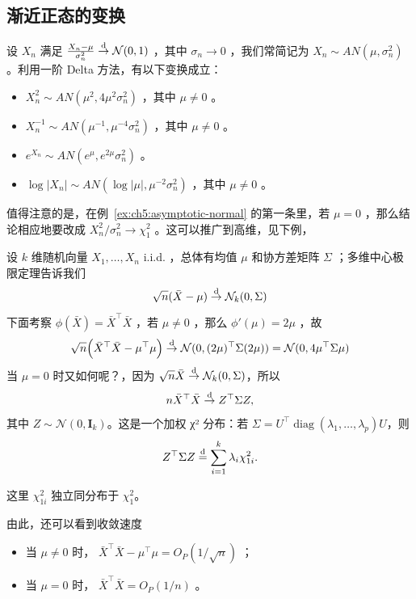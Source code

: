 \subsection{渐近正态的变换}

\begin{example} \label{ex:ch5:asymptotic-normal}
设 $X_n$ 满足 $\frac{X_n-\mu}{\sigma_n^2}\overset{\rm d}\to \mathcal N(0,1)$ ，其中 $\sigma_n\to 0$ ，我们常简记为 $X_n \sim AN(\mu,\sigma_n^2)$。利用一阶 Delta 方法，有以下变换成立：

\begin{itemize}
\tightlist
\item
  $X^2_n \sim AN(\mu^2,4\mu^2\sigma_n^2)$ ，其中 $\mu\ne 0$ 。
\item
  $X_n^{-1}\sim AN(\mu^{-1},\mu^{-4}\sigma_n^2)$ ，其中 $\mu\ne 0$ 。
\item
  $e^{X_n}\sim AN(e^\mu,e^{2\mu}\sigma_n^2)$ 。
\item
  $\log |X_n|\sim AN(\log |\mu|,\mu^{-2}\sigma_n^2 )$ ，其中 $\mu\ne 0$ 。
\end{itemize}
\end{example}


值得注意的是，在例~\ref{ex:ch5:asymptotic-normal} 的第一条里，若 $\mu=0$ ，那么结论相应地要改成 $X_n^2/\sigma_n^2 \to \chi_1^2$ 。这可以推广到高维，见下例，


\begin{example}
设 $k$ 维随机向量 $X_1,\dots,X_n$ i.i.d. ，总体有均值 $\mu$ 和协方差矩阵 $\Sigma$ ；多维中心极限定理告诉我们 \[ \sqrt{n}(\bar{X}-\mu)\overset{\rm d}\to \mathcal N_k(0,\Sigma) \]下面考察 $\phi(\bar{X})=\bar{X}^\top \bar X$ ，若 $\mu\ne 0$ ，那么 $\phi'(\mu)=2\mu$ ，故
\[\sqrt n\Big(\bar{X}^\top\bar{X}-\mu^\top\mu\Big)\overset{\rm d}\to \mathcal N(0,(2\mu)^\top\Sigma(2\mu))=\mathcal N(0,4\mu^\top\Sigma\mu)\]
当 $\mu=0$ 时又如何呢？，因为 $\sqrt{n}\bar{X} \overset{\rm d}\to \mathcal{N}_k(0,\Sigma)$，所以
\[n\bar{X}^\top\bar{X} \overset{\rm d}\to Z^\top \Sigma Z,\]
其中 $Z\sim\mathcal{N}(0,\mathbf I_k)$。这是一个加权 χ² 分布：若 $\Sigma = U^\top \operatorname{diag}(\lambda_1,\dots,\lambda_p)U$，则
\[
Z^\top\Sigma Z \overset{\rm d}= \sum_{i=1}^k \lambda_i \chi_{1i}^2.
\]

这里 $\chi_{1i}^2$ 独立同分布于 $\chi_1^2$。

由此，还可以看到收敛速度

\begin{itemize}
\tightlist
\item
  当 $\mu\ne 0$ 时， $\bar{X}^\top\bar{X}-\mu^\top\mu=O_P(1/\sqrt n)$ ；
\item
  当 $\mu=0$ 时， $\bar{X}^\top\bar{X}=O_P(1/n)$ 。
\end{itemize}
\end{example}

